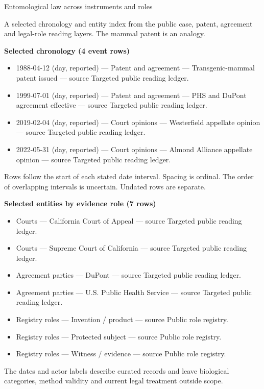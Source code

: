 \documentclass[
  english,
]{article}
\providecommand{\tightlist}{%
  \setlength{\itemsep}{0pt}\setlength{\parskip}{0pt}}
\begin{document}
Entomological law across instruments and roles

A selected chronology and entity index from the public case, patent,
agreement and legal-role reading layers. The mammal patent is an
analogy.

\textbf{Selected chronology (4 event rows)}

\begin{itemize}
\tightlist
\item
  1988-04-12 (day, reported) --- Patent and agreement ---
  Transgenic-mammal patent issued --- source Targeted public reading
  ledger.
\item
  1999-07-01 (day, reported) --- Patent and agreement --- PHS and DuPont
  agreement effective --- source Targeted public reading ledger.
\item
  2019-02-04 (day, reported) --- Court opinions --- Westerfield
  appellate opinion --- source Targeted public reading ledger.
\item
  2022-05-31 (day, reported) --- Court opinions --- Almond Alliance
  appellate opinion --- source Targeted public reading ledger.
\end{itemize}

Rows follow the start of each stated date interval. Spacing is ordinal.
The order of overlapping intervals is uncertain. Undated rows are
separate.

\textbf{Selected entities by evidence role (7 rows)}

\begin{itemize}
\tightlist
\item
  Courts --- California Court of Appeal --- source Targeted public
  reading ledger.
\item
  Courts --- Supreme Court of California --- source Targeted public
  reading ledger.
\item
  Agreement parties --- DuPont --- source Targeted public reading
  ledger.
\item
  Agreement parties --- U.S. Public Health Service --- source Targeted
  public reading ledger.
\item
  Registry roles --- Invention / product --- source Public role
  registry.
\item
  Registry roles --- Protected subject --- source Public role registry.
\item
  Registry roles --- Witness / evidence --- source Public role registry.
\end{itemize}

The dates and actor labels describe curated records and leave biological
categories, method validity and current legal treatment outside scope.
\end{document}
